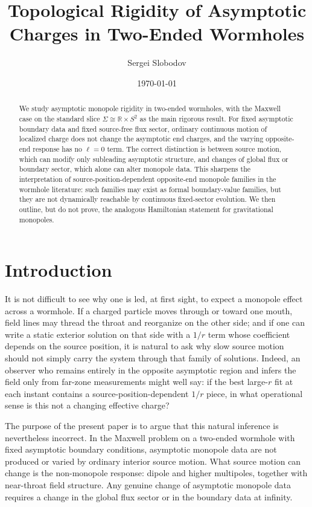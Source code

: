 \documentclass[aps,prd,onecolumn,nofootinbib,superscriptaddress]{revtex4-2}
\begin{document}
\title{Topological Rigidity of Asymptotic Charges in Two-Ended Wormholes}
\author{Sergei Slobodov}
\date{\today}

\begin{abstract}
We study asymptotic monopole rigidity in two-ended wormholes, with the Maxwell case on the standard slice $\Sigma\cong\mathbb{R}\times S^2$ as the main rigorous result. For fixed asymptotic boundary data and fixed source-free flux sector, ordinary continuous motion of localized charge does not change the asymptotic end charges, and the varying opposite-end response has no $\ell=0$ term. The correct distinction is between source motion, which can modify only subleading asymptotic structure, and changes of global flux or boundary sector, which alone can alter monopole data. This sharpens the interpretation of source-position-dependent opposite-end monopole families in the wormhole literature: such families may exist as formal boundary-value families, but they are not dynamically reachable by continuous fixed-sector evolution. We then outline, but do not prove, the analogous Hamiltonian statement for gravitational monopoles.
\end{abstract}

\maketitle

\section{Introduction}

It is not difficult to see why one is led, at first sight, to expect a monopole effect across a wormhole. If a charged particle moves through or toward one mouth, field lines may thread the throat and reorganize on the other side; and if one can write a static exterior solution on that side with a $1/r$ term whose coefficient depends on the source position, it is natural to ask why slow source motion should not simply carry the system through that family of solutions.\cite{MorrisThorne1988Wormholes,Visser1995LorentzianWormholes} Indeed, an observer who remains entirely in the opposite asymptotic region and infers the field only from far-zone measurements might well say: if the best large-$r$ fit at each instant contains a source-position-dependent $1/r$ piece, in what operational sense is this not a changing effective charge?

The purpose of the present paper is to argue that this natural inference is nevertheless incorrect. In the Maxwell problem on a two-ended wormhole with fixed asymptotic boundary conditions, asymptotic monopole data are not produced or varied by ordinary interior source motion. What source motion can change is the non-monopole response: dipole and higher multipoles, together with near-throat field structure. Any genuine change of asymptotic monopole data requires a change in the global flux sector or in the boundary data at infinity.
\end{document}
